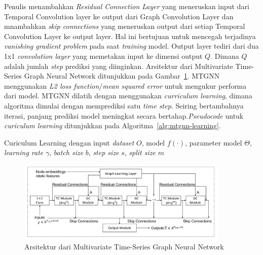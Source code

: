 Penulis menambahkan \textit{Residual Connection Layer} yang meneruskan input dari Temporal Convolution layer ke output dari Graph Convolution Layer  dan mnambahkan \textit{skip connections} yang meneruskan output dari setiap Temporal Convolution Layer ke output layer. Hal ini bertujuan untuk mencegah terjadinya \textit{vanishing gradient problem} pada saat \textit{training} model. Output layer tediri dari dua 1x1 \textit{convolution layer} yang memetakan input ke dimensi output $Q$. Dimana $Q$ adalah jumlah \textit{step} prediksi yang diinginkan. Arsitektur dari Multivariate Time-Series Graph Neural Network ditunjukkan pada Gambar~\ref{fig:mtgnn-architecture}. MTGNN menggunakan \textit{L2 loss function}/\textit{mean squared error}  untuk mengukur performa dari model. MTGNN dilatih dengan menggunakan \textit{curriculum learning}, dimana algoritma dimulai dengan memprediksi satu \textit{time step}. Seiring bertambahnya iterasi, panjang prediksi model meningkat secara bertahap.\textit{Pseudocode} untuk  \textit{curiculum learning} ditunjukkan pada Algoritma~\ref{alg:mtgnn-learning}.


\begin{algorithm}
\caption{Curiculum Learning dengan input \textit{dataset} $O$, model $f(\cdot)$, parameter model $\Theta$, \textit{learning rate} $\gamma$, \textit{batch size} $b$, \textit{step size} $s$, \textit{split size} $m$}
\label{alg:mtgnn-learning}
\end{algorithm}

\begin{figure}[H]
    \centering
    \includegraphics[width=0.9\textwidth]{figures/mtgnn.png}
    \caption{Arsitektur dari Multivariate Time-Series Graph Neural Network}
    \label{fig:mtgnn-architecture}
\end{figure}
